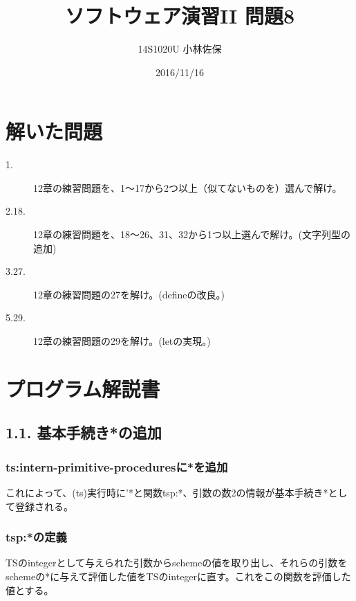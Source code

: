\documentclass{jarticle}
\begin{document}
\begin{titlepage}
\title{ソフトウェア演習II 問題8}
\date{2016/11/16}
\author{14S1020U 小林佐保}
\maketitle
\thispagestyle{empty}
\end{titlepage}
\section{解いた問題}

\begin{description}
 \item[1.] 12章の練習問題を、1～17から2つ以上（似てないものを）選んで解け。
 \item[2.18.] 12章の練習問題を、18～26、31、32から1つ以上選んで解け。(文字列型の追加)
 \item[3.27.] 12章の練習問題の27を解け。(defineの改良。)
 \item[5.29.] 12章の練習問題の29を解け。(letの実現。)
\end{description}

\section{プログラム解説書}
\subsection{1.1. 基本手続き*の追加}
\subsubsection{ts:intern-primitive-proceduresに*を追加}
これによって、(ts)実行時に'*と関数tsp:*、引数の数2の情報が基本手続き*として登録される。\par
\subsubsection{tsp:*の定義}
TSのintegerとして与えられた引数からschemeの値を取り出し、それらの引数をschemeの*に与えて評価した値をTSのintegerに直す。これをこの関数を評価した値とする。\par
\end{document}
